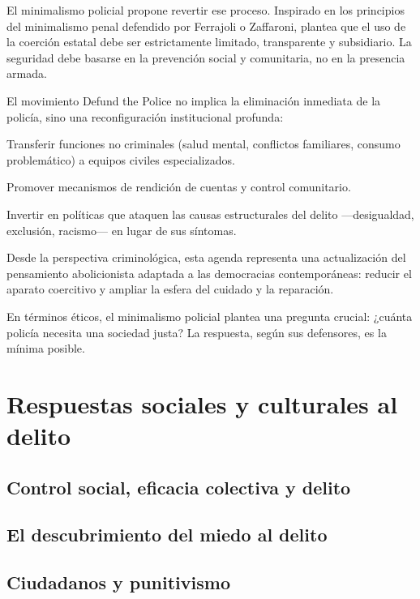\documentclass[
  spanish,
  letterpaper,
  DIV=11,
  numbers=noendperiod]{scrreprt}
\begin{document}
El minimalismo policial propone revertir ese proceso. Inspirado en los
principios del minimalismo penal defendido por Ferrajoli o Zaffaroni,
plantea que el uso de la coerción estatal debe ser estrictamente
limitado, transparente y subsidiario. La seguridad debe basarse en la
prevención social y comunitaria, no en la presencia armada.

El movimiento Defund the Police no implica la eliminación inmediata de
la policía, sino una reconfiguración institucional profunda:

Transferir funciones no criminales (salud mental, conflictos familiares,
consumo problemático) a equipos civiles especializados.

Promover mecanismos de rendición de cuentas y control comunitario.

Invertir en políticas que ataquen las causas estructurales del delito
---desigualdad, exclusión, racismo--- en lugar de sus síntomas.

Desde la perspectiva criminológica, esta agenda representa una
actualización del pensamiento abolicionista adaptada a las democracias
contemporáneas: reducir el aparato coercitivo y ampliar la esfera del
cuidado y la reparación.

En términos éticos, el minimalismo policial plantea una pregunta
crucial: ¿cuánta policía necesita una sociedad justa? La respuesta,
según sus defensores, es la mínima posible.

\chapter{Respuestas sociales y culturales al
delito}\label{respuestas-sociales-y-culturales-al-delito}

\section{Control social, eficacia colectiva y
delito}\label{control-social-eficacia-colectiva-y-delito}

\section{El descubrimiento del miedo al
delito}\label{el-descubrimiento-del-miedo-al-delito}

\section{Ciudadanos y punitivismo}\label{ciudadanos-y-punitivismo}
\end{document}
